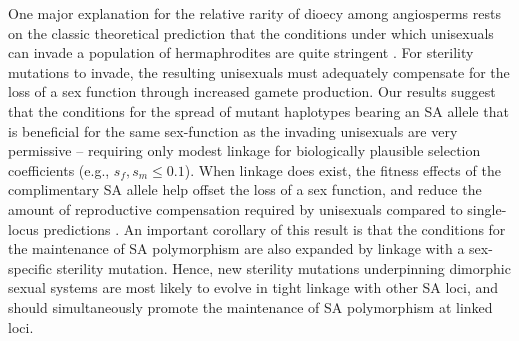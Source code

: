 \documentclass[9pt,twocolumn,twoside,lineno]{gsajnl}
\begin{document}
One major explanation for the relative rarity of dioecy among angiosperms rests on the classic theoretical prediction that the conditions under which unisexuals can invade a population of hermaphrodites are quite stringent \citep{Lloyd1975,Lloyd1976,Charlesworth1978a,KaferPannell2017}. For sterility mutations to invade, the resulting unisexuals must adequately compensate for the loss of a sex function through increased gamete production. Our results suggest that the conditions for the spread of mutant haplotypes bearing an SA allele that is beneficial for the same sex-function as the invading unisexuals are very permissive -- requiring only modest linkage for biologically plausible selection coefficients (e.g., $s_f,s_m \leq 0.1$). When linkage does exist, the fitness effects of the complimentary SA allele help offset the loss of a sex function, and reduce the amount of reproductive compensation required by unisexuals compared to single-locus predictions \citep{Charlesworth1978a}. An important corollary of this result is that the conditions for the maintenance of SA polymorphism are also expanded by linkage with a sex-specific sterility mutation. Hence, new sterility mutations underpinning dimorphic sexual systems are most likely to evolve in tight linkage with other SA loci, and should simultaneously promote the maintenance of SA polymorphism at linked loci. 
\end{document}
